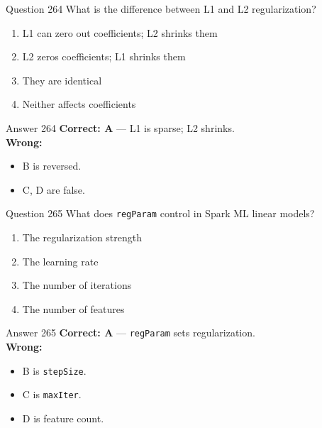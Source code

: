 \documentclass[aspectratio=169,11pt]{beamer}
\begin{document}
	\begin{frame}{Question 264}
		What is the difference between L1 and L2 regularization?
		\begin{enumerate}[label=\Alph*.]
			\item L1 can zero out coefficients; L2 shrinks them
			\item L2 zeros coefficients; L1 shrinks them
			\item They are identical
			\item Neither affects coefficients
		\end{enumerate}
	\end{frame}
	\begin{frame}{Answer 264}
		\textbf{Correct: A} --- L1 is sparse; L2 shrinks.\\
		\vspace{0.5em}
		\textbf{Wrong:}
		\begin{itemize}
			\item B is reversed.
			\item C, D are false.
		\end{itemize}
	\end{frame}
	
	\begin{frame}{Question 265}
		What does \texttt{regParam} control in Spark ML linear models?
		\begin{enumerate}[label=\Alph*.]
			\item The regularization strength
			\item The learning rate
			\item The number of iterations
			\item The number of features
		\end{enumerate}
	\end{frame}
	\begin{frame}{Answer 265}
		\textbf{Correct: A} --- \texttt{regParam} sets regularization.\\
		\vspace{0.5em}
		\textbf{Wrong:}
		\begin{itemize}
			\item B is \texttt{stepSize}.
			\item C is \texttt{maxIter}.
			\item D is feature count.
		\end{itemize}
	\end{frame}
	
\end{document}
